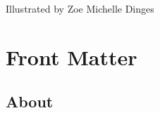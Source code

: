 \documentclass[
  letterpaper,
]{book}
\renewcommand*\contentsname{Table of contents}
\newcommand\contentsname{Table of contents}
\begin{document}
\begin{frontmatter}
\begin{titlepage}
\newcommand{\footerblock}{{\titlepagefooterfont
\titlepagefooterblock}

\vspace{1pt}
}

\newcommand{\dateblock}{{\titlepagedateblock}

\vspace{0pt}
}

\newcommand{\headerblock}{}

\thispagestyle{empty} %


\newlength{\minipagewidth}
\setlength{\minipagewidth}{\textwidth}
\raggedright %
\begin{minipage}[b][\textheight][s]{\minipagewidth}
\titlepagepagealign
\titleblock

\authorblock

\Large Illustrated by Zoe Michelle Dinges

\vfill

\logoblock

\footerblock
\par

\end{minipage}
\clearpage
\restoregeometry
\end{titlepage}
\setcounter{page}{1}
\end{frontmatter}


\renewcommand*\contentsname{Contents}
{
\hypersetup{linkcolor=}
\setcounter{tocdepth}{2}
\tableofcontents
}
\listoffigures
\listoftables
\mainmatter
{}

\chapter*{Front Matter}\label{front-matter}


\section*{About}\label{about}
\end{document}
